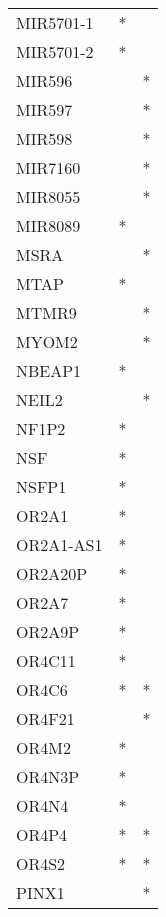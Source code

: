 \begin{longtable}{lcc}
MIR5701-1    &              * &            \\
MIR5701-2    &              * &            \\
MIR596       &                &          * \\
MIR597       &                &          * \\
MIR598       &                &          * \\
MIR7160      &                &          * \\
MIR8055      &                &          * \\
MIR8089      &              * &            \\
MSRA         &                &          * \\
MTAP         &              * &            \\
MTMR9        &                &          * \\
MYOM2        &                &          * \\
NBEAP1       &              * &            \\
NEIL2        &                &          * \\
NF1P2        &              * &            \\
NSF          &              * &            \\
NSFP1        &              * &            \\
OR2A1        &              * &            \\
OR2A1-AS1    &              * &            \\
OR2A20P      &              * &            \\
OR2A7        &              * &            \\
OR2A9P       &              * &            \\
OR4C11       &              * &            \\
OR4C6        &              * &          * \\
OR4F21       &                &          * \\
OR4M2        &              * &            \\
OR4N3P       &              * &            \\
OR4N4        &              * &            \\
OR4P4        &              * &          * \\
OR4S2        &              * &          * \\
PINX1        &                &          * \\

\end{longtable}
